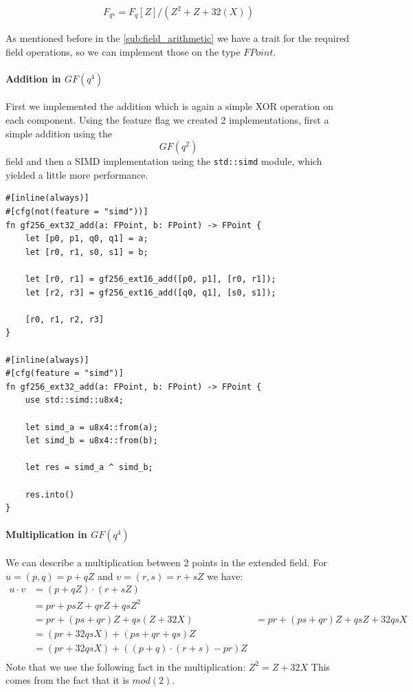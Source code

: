 \documentclass[11pt]{report}
\theoremstyle{definition}
\theoremstyle{plain}
\begin{document}
\begin{align}
  F_{q^4} = F_q[Z] / (Z^2 + Z + 32(X))
\end{align}

As mentioned before in the \autoref{sub:field_arithmetic} we have a trait for the required field operations, so we can implement those on the type $FPoint$.

\paragraph{Addition in $GF(q^4)$}

First we implemented the addition which is again a simple XOR operation on each component. Using the feature flag we created 2 implementations, first a simple addition using the $$GF(q^2)$$ field and then a SIMD implementation using the \texttt{std::simd} module, which yielded a little more performance.
\begin{verbatim}
#[inline(always)]
#[cfg(not(feature = "simd"))]
fn gf256_ext32_add(a: FPoint, b: FPoint) -> FPoint {
    let [p0, p1, q0, q1] = a;
    let [r0, r1, s0, s1] = b;

    let [r0, r1] = gf256_ext16_add([p0, p1], [r0, r1]);
    let [r2, r3] = gf256_ext16_add([q0, q1], [s0, s1]);

    [r0, r1, r2, r3]
}

#[inline(always)]
#[cfg(feature = "simd")]
fn gf256_ext32_add(a: FPoint, b: FPoint) -> FPoint {
    use std::simd::u8x4;

    let simd_a = u8x4::from(a);
    let simd_b = u8x4::from(b);

    let res = simd_a ^ simd_b;

    res.into()
}
\end{verbatim}

\paragraph{Multiplication in $GF(q^4)$}
We can describe a multiplication between 2 points in the extended field.
For $u = (p,q) = p + qZ$ and $v = (r,s) = r + sZ$ we have:
\begin{align}
  u \cdot v &= (p + qZ) \cdot (r + sZ) \\
        &= pr + psZ + qrZ + qsZ^2\\
        &= pr + (ps + qr)Z + qs(Z + 32X) 
        &= pr + (ps + qr)Z + qsZ + 32qsX\\ 
        &= (pr + 32qsX) + (ps + qr + qs)Z\\
        &= (pr + 32qsX) + ((p + q) \cdot (r + s) - pr)Z\\
\end{align}
Note that we use the following fact in the multiplication: $Z^2 = Z + 32X$ This comes from the fact that it is $mod(2)$.
\end{document}
